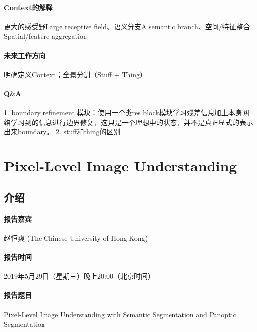 \documentclass[UTF8, a4paper]{ctexart}
\begin{document}
\paragraph{Context的解释} 更大的感受野Large receptive field、语义分支A semantic branch、空间/特征整合Spatial/feature aggregation
\paragraph{未来工作方向} 明确定义Context；全景分割（Stuff + Thing）
\paragraph{Q$\&$A}
1. boundary refinement 模块：使用一个类res block模块学习残差信息加上本身网络学习到的信息进行边界修复，这只是一个理想中的状态，并不是真正显式的表示出来boundary。
2. stuff和thing的区别

\section{Pixel-Level Image Understanding}

\subsection{介绍}

\paragraph{报告嘉宾}赵恒爽 (The Chinese University of Hong Kong)

\paragraph{报告时间}2019年5月29日（星期三）晚上20:00（北京时间）

\paragraph{报告题目}Pixel-Level Image Understanding with Semantic Segmentation and Panoptic Segmentation
\end{document}
